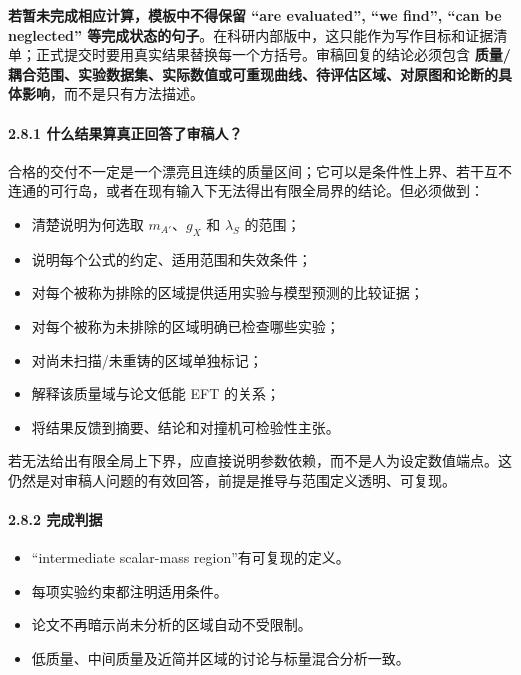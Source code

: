 \documentclass[
  chinese,
  UTF8]{ctexart}
\providecommand{\tightlist}{%
  \setlength{\itemsep}{0pt}\setlength{\parskip}{0pt}}
\begin{document}
\textbf{若暂未完成相应计算，模板中不得保留 ``are evaluated'', ``we
find'', ``can be neglected''
等完成状态的句子}。在科研内部版中，这只能作为写作目标和证据清单；正式提交时要用真实结果替换每一个方括号。审稿回复的结论必须包含
\textbf{质量/耦合范围、实验数据集、实际数值或可重现曲线、待评估区域、对原图和论断的具体影响}，而不是只有方法描述。

\paragraph{2.8.1
什么结果算真正回答了审稿人？}\label{ux4ec0ux4e48ux7ed3ux679cux7b97ux771fux6b63ux56deux7b54ux4e86ux5ba1ux7a3fux4eba}

合格的交付不一定是一个漂亮且连续的质量区间；它可以是条件性上界、若干互不连通的可行岛，或者在现有输入下无法得出有限全局界的结论。但必须做到：

\begin{itemize}
\tightlist
\item
  清楚说明为何选取 \(m_{A'}\)、\(g_X\) 和 \(\lambda_S\) 的范围；
\item
  说明每个公式的约定、适用范围和失效条件；
\item
  对每个被称为排除的区域提供适用实验与模型预测的比较证据；
\item
  对每个被称为未排除的区域明确已检查哪些实验；
\item
  对尚未扫描/未重铸的区域单独标记；
\item
  解释该质量域与论文低能 EFT 的关系；
\item
  将结果反馈到摘要、结论和对撞机可检验性主张。
\end{itemize}

若无法给出有限全局上下界，应直接说明参数依赖，而不是人为设定数值端点。这仍然是对审稿人问题的有效回答，前提是推导与范围定义透明、可复现。

\paragraph{2.8.2 完成判据}\label{ux5b8cux6210ux5224ux636e}

\begin{itemize}
\tightlist
\item
  ``intermediate scalar-mass region''有可复现的定义。
\item
  每项实验约束都注明适用条件。
\item
  论文不再暗示尚未分析的区域自动不受限制。
\item
  低质量、中间质量及近简并区域的讨论与标量混合分析一致。
\end{itemize}
\end{document}
